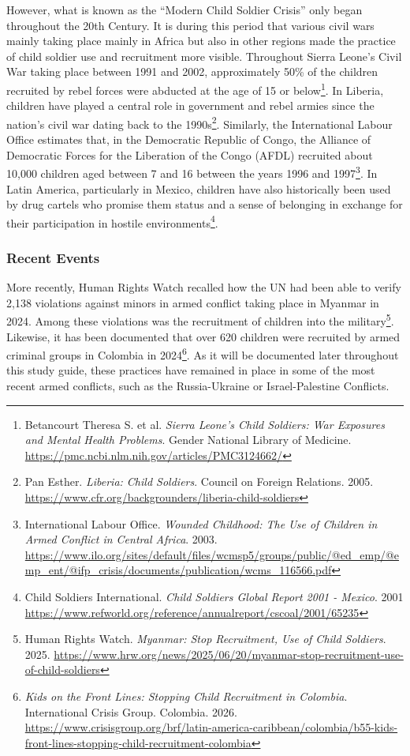 However, what is known as the “Modern Child Soldier Crisis” only began throughout the 20th Century. It is during this period that various civil wars mainly taking place mainly in Africa but also in other regions made the practice of child soldier use and recruitment more visible. Throughout Sierra Leone’s Civil War taking place between 1991 and 2002, approximately  50\% of the children recruited by rebel forces were abducted at the age of 15 or below\footnote{Betancourt Theresa S. et al. \emph{Sierra Leone’s Child Soldiers: War Exposures and Mental Health Problems}. Gender National Library of Medicine. \url{https://pmc.ncbi.nlm.nih.gov/articles/PMC3124662/}}. In Liberia, children have played a central role in government and rebel armies since the nation’s civil war dating back to the 1990s\footnote{Pan Esther. \emph{Liberia: Child Soldiers}. Council on Foreign Relations. 2005.  \url{https://www.cfr.org/backgrounders/liberia-child-soldiers}}. Similarly, the International Labour Office estimates that, in the Democratic Republic of Congo, the Alliance of Democratic Forces for the Liberation of the Congo (AFDL) recruited about 10,000 children aged between 7 and 16 between the years 1996 and 1997\footnote{International Labour Office. \emph{Wounded Childhood: The Use of Children in Armed Conflict in Central Africa}. 2003. \url{https://www.ilo.org/sites/default/files/wcmsp5/groups/public/@ed_emp/@emp_ent/@ifp_crisis/documents/publication/wcms_116566.pdf}}. In Latin America, particularly in Mexico, children have also historically been used by drug cartels who promise them status and a sense of belonging in exchange for their participation in hostile environments\footnote{Child Soldiers International. \emph{Child Soldiers Global Report 2001 - Mexico}. 2001 \url{https://www.refworld.org/reference/annualreport/cscoal/2001/65235}}.

\subsubsection{Recent Events}

More recently, Human Rights Watch recalled how the UN had been able to verify 2,138 violations against minors in armed conflict taking place in Myanmar in 2024. Among these violations was the recruitment of children into the military\footnote{Human Rights Watch. \emph{Myanmar: Stop Recruitment, Use of Child Soldiers}. 2025. \url{https://www.hrw.org/news/2025/06/20/myanmar-stop-recruitment-use-of-child-soldiers}}. Likewise, it has been documented that over 620 children were recruited by armed criminal groups in Colombia in 2024\footnote{\emph{Kids on the Front Lines: Stopping Child Recruitment in Colombia}. International Crisis Group. Colombia. 2026. \url{https://www.crisisgroup.org/brf/latin-america-caribbean/colombia/b55-kids-front-lines-stopping-child-recruitment-colombia}}. As it will be documented later throughout this study guide, these practices have remained in place in some of the most recent armed conflicts, such as the Russia-Ukraine or Israel-Palestine Conflicts.

